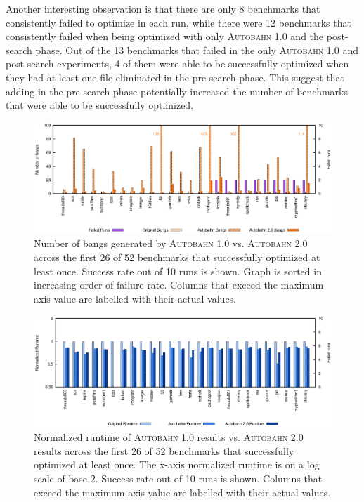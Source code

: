 \documentclass[format=sigplan, review=true]{acmart}
\newcommand{\Ao}[0]{\textsc{Autobahn 1.0}}
\newcommand{\At}[0]{\textsc{Autobahn 2.0}}
\newcommand{\preopt}[0]{pre-search}
\newcommand{\postopt}[0]{post-search}
\begin{document}
Another interesting observation is that there are only 8 benchmarks that consistently failed to optimize in each run, while there were 12 benchmarks that consistently failed when being optimized with only \Ao{} and the \postopt{} phase. Out of the 13 benchmarks that failed in the only \Ao{} and \postopt{} experiments, 4 of them were able to be successfully optimized when they had at least one file eliminated in the \preopt{} phase. This suggest that adding in the \preopt{} phase potentially increased the number of benchmarks that were able to be successfully optimized.

\begin{figure}
\includegraphics[width=\textwidth]{pap0-bangs}
\caption{Number of bangs generated by \Ao{} vs. \At{} across the first 26 of 52 benchmarks that successfully optimized at least once. Success rate out of 10 runs is shown. Graph is sorted in increasing order of failure rate. Columns that exceed the maximum axis value are labelled with their actual values.}
\end{figure}

\begin{figure}
\includegraphics[width=\textwidth]{pap0}
\caption{Normalized runtime of \Ao{} results vs. \At{} results across the first 26 of 52 benchmarks that successfully optimized at least once. The x-axis normalized runtime is on a log scale of base 2. Success rate out of 10 runs is shown. Columns that exceed the maximum axis value are labelled with their actual values.}
\end{figure}
\end{document}
